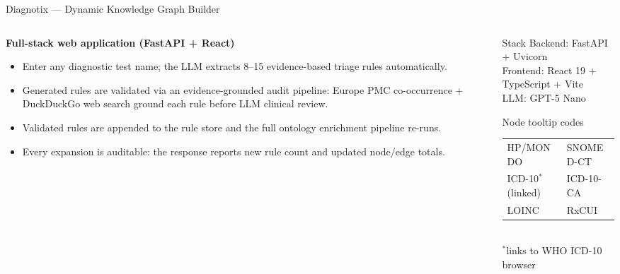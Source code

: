 \documentclass[aspectratio=169]{beamer}
\begin{document}
\begin{frame}[fragile]{Diagnotix --- Dynamic Knowledge Graph Builder}
  \begin{columns}[T]
    \begin{column}{0.52\textwidth}
      \textbf{Full-stack web application (FastAPI + React)}

      \begin{itemize}
        \item Enter any diagnostic test name; the LLM extracts
              8--15 evidence-based triage rules automatically.
        \item Generated rules are validated via an evidence-grounded
              audit pipeline: Europe PMC co-occurrence + DuckDuckGo
              web search ground each rule before LLM clinical review.
        \item Validated rules are appended to the rule store and the
              full ontology enrichment pipeline re-runs.
        \item Every expansion is auditable: the response reports
              new rule count and updated node/edge totals.
      \end{itemize}
    \end{column}
    \begin{column}{0.45\textwidth}
      \begin{block}{Stack}
        \small
        Backend: FastAPI + Uvicorn\\
        Frontend: React 19 + TypeScript + Vite\\
        LLM: GPT-5 Nano
      \end{block}
      \begin{block}{Node tooltip codes}
        \small
        \begin{tabular}{@{}ll@{}}
          HP/MONDO    & SNOMED-CT \\
          ICD-10$^{*}$ (linked) & ICD-10-CA \\
          LOINC       & RxCUI \\
        \end{tabular}\\[2pt]
        \tiny $^{*}$links to WHO ICD-10 browser
      \end{block}
    \end{column}
  \end{columns}
\end{frame}

\end{document}

